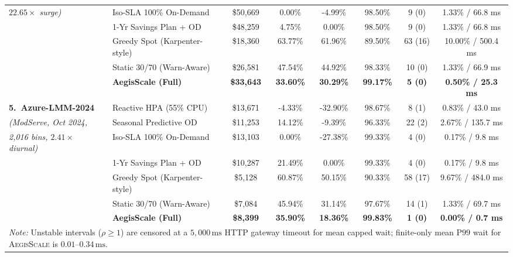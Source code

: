 \documentclass[journal]{IEEEtran}
\begin{document}
\begin{table}[t]
{\begin{tabular}{llcccccc}
\emph{$22.65\times$ surge)}        & Iso-SLA 100\% On-Demand       & \$50,669 & 0.00\%             & -4.99\%            & 98.50\% & 9 (0)    & 1.33\% / 66.8 ms \\
                                   & 1-Yr Savings Plan + OD        & \$48,259 & 4.75\%             & 0.00\%             & 98.50\% & 9 (0)    & 1.33\% / 66.8 ms \\
                                   & Greedy Spot (Karpenter-style) & \$18,360 & 63.77\%            & 61.96\%            & 89.50\% & 63 (16)  & 10.00\% / 500.4 ms \\
                                   & Static 30/70 (Warn-Aware)     & \$26,581 & 47.54\%            & 44.92\%            & 98.33\% & 10 (0)   & 1.33\% / 66.9 ms \\
                                   & \textbf{AegisScale (Full)}    & \textbf{\$33,643} & \textbf{33.60\%} & \textbf{30.29\%} & \textbf{99.17\%} & \textbf{5 (0)} & \textbf{0.50\% / 25.3 ms} \\
\hline
\textbf{5.\ Azure-LMM-2024}        & Reactive HPA (55\% CPU)       & \$13,671 & -4.33\%            & -32.90\%           & 98.67\% & 8 (1)    & 0.83\% / 43.0 ms \\
\emph{(ModServe, Oct 2024,}        & Seasonal Predictive OD        & \$11,253 & 14.12\%            & -9.39\%            & 96.33\% & 22 (2)   & 2.67\% / 135.7 ms \\
\emph{2,016 bins, $2.41\times$ diurnal)} & Iso-SLA 100\% On-Demand & \$13,103 & 0.00\%             & -27.38\%           & 99.33\% & 4 (0)    & 0.17\% / 9.8 ms \\
                                   & 1-Yr Savings Plan + OD        & \$10,287 & 21.49\%            & 0.00\%             & 99.33\% & 4 (0)    & 0.17\% / 9.8 ms \\
                                   & Greedy Spot (Karpenter-style) & \$5,128  & 60.87\%            & 50.15\%            & 90.33\% & 58 (17)  & 9.67\% / 484.0 ms \\
                                   & Static 30/70 (Warn-Aware)     & \$7,084  & 45.94\%            & 31.14\%            & 97.67\% & 14 (1)   & 1.33\% / 69.7 ms \\
                                   & \textbf{AegisScale (Full)}    & \textbf{\$8,399}  & \textbf{35.90\%} & \textbf{18.36\%} & \textbf{99.83\%} & \textbf{1 (0)} & \textbf{0.00\% / 0.7 ms} \\
\hline
\multicolumn{8}{l}{\footnotesize \emph{Note:} Unstable intervals ($\rho \ge 1$) are censored at a $5,000\,\mathrm{ms}$ HTTP gateway timeout for mean capped wait; finite-only mean $\mathrm{P99}$ wait for \textsc{AegisScale} is $0.01$--$0.34\,\mathrm{ms}$.}
\end{tabular}%
}
\end{table}
\end{document}
